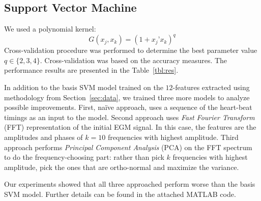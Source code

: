 \subsection{Support Vector Machine}
\label{sec:svm}

We used a polynomial kernel:
\begin{equation*}
G(x_{j},x_{k}) = (1+x_{j}’ x_{k})^{q}
\end{equation*}
Cross-validation procedure was performed to determine the best 
parameter value $q\in\{2,3,4\}$. Cross-validation was based 
on the accuracy measures. The performance results are presented in 
the Table~\ref{tbl:res}. 

In addition to the basis SVM model trained on the $12$-features 
extracted using methodology from Section~\ref{sec:data}, we trained 
three more models to analyze possible improvements. First, na\"ive 
approach, uses a sequence of the heart-beat timings as an input to 
the model.
Second approach uses \textit{Fast Fourier Transform} (FFT) 
representation of the initial EGM signal. In this case, the 
features are the amplitudes and phases of $k=10$ frequencies with 
highest amplitude. 
Third approach performs \textit{Principal Component Analysis} (PCA) 
on the FFT spectrum to do the frequency-choosing part: rather than 
pick $k$ frequencies with 
highest amplitude, pick the ones that are ortho-normal and maximize 
the variance. 

Our experiments showed that all three approached perform worse than 
the basis SVM model. Further details can be found in the attached 
MATLAB code.




